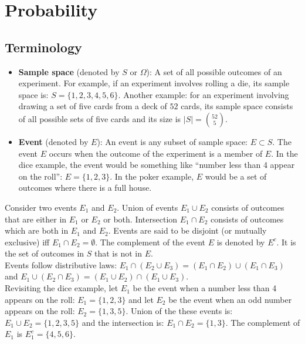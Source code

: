 \section{Probability}

\subsection{Terminology}

\begin{itemize}
	\item \textbf{Sample space} (denoted by $S$ or $\Omega$): A set of all possible outcomes of an experiment. For example, if an experiment involves rolling a die, its sample space is: $S=\{1, 2, 3, 4, 5, 6\}$. Another example: for an experiment involving drawing a set of five cards from a deck of $52$ cards, its sample space consists of all possible sets of five cards and its size is $|S|=\binom{52}{5}$.
	\item \textbf{Event} (denoted by $E$): An event is any subset of sample space: $E \subset S$. The event $E$ occurs when the outcome of the experiment is a member of $E$. In the dice example, the event would be something like ``number less than 4 appear on the roll'': $E=\{1, 2, 3\}$. In the poker example, $E$ would be a set of outcomes where there is a full house.
\end{itemize}

Consider two events $E_1$ and $E_2$. Union of events $E_1 \cup E_2$ consists of outcomes that are either in $E_1$ or $E_2$ or both. Intersection $E_1 \cap E_2$ consists of outcomes which are both in $E_1$ and $E_2$. Events are said to be disjoint (or mutually exclusive) iff $E_1 \cap E_2 = \emptyset$. The complement of the event $E$ is denoted by $E^c$. It is the set of outcomes in $S$ that is not in $E$. \\

Events follow distributive laws: $E_1 \cap (E_2 \cup E_3) = (E_1 \cap E_2) \cup (E_1 \cap E_3)$ and $E_1 \cup (E_2 \cap E_3) = (E_1 \cup E_2) \cap (E_1 \cup E_3)$. \\

Revisiting the dice example, let $E_1$ be the event when a number less than 4 appears on the roll: $E_1=\{1, 2, 3\}$ and let $E_2$ be the event when an odd number appears on the roll: $E_2=\{1, 3, 5\}$. Union of the these events is: $E_1 \cup E_2 = \{1, 2, 3, 5\}$ and the intersection is: $E_1 \cap E_2 = \{1, 3\}$. The complement of $E_1$ is $E_1^c=\{4, 5, 6\}$.

